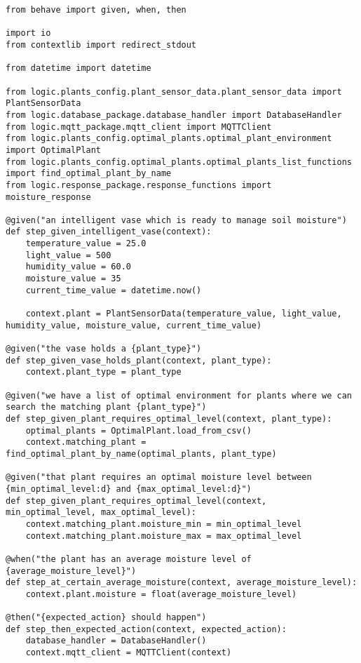\begin{longlisting}
\begin{verbatim}
from behave import given, when, then

import io
from contextlib import redirect_stdout

from datetime import datetime

from logic.plants_config.plant_sensor_data.plant_sensor_data import PlantSensorData
from logic.database_package.database_handler import DatabaseHandler
from logic.mqtt_package.mqtt_client import MQTTClient
from logic.plants_config.optimal_plants.optimal_plant_environment import OptimalPlant
from logic.plants_config.optimal_plants.optimal_plants_list_functions import find_optimal_plant_by_name
from logic.response_package.response_functions import moisture_response

@given("an intelligent vase which is ready to manage soil moisture")
def step_given_intelligent_vase(context):
    temperature_value = 25.0
    light_value = 500
    humidity_value = 60.0
    moisture_value = 35
    current_time_value = datetime.now()

    context.plant = PlantSensorData(temperature_value, light_value, humidity_value, moisture_value, current_time_value)

@given("the vase holds a {plant_type}")
def step_given_vase_holds_plant(context, plant_type):
    context.plant_type = plant_type

@given("we have a list of optimal environment for plants where we can search the matching plant {plant_type}")
def step_given_plant_requires_optimal_level(context, plant_type):
    optimal_plants = OptimalPlant.load_from_csv()
    context.matching_plant = find_optimal_plant_by_name(optimal_plants, plant_type)

@given("that plant requires an optimal moisture level between {min_optimal_level:d} and {max_optimal_level:d}")
def step_given_plant_requires_optimal_level(context, min_optimal_level, max_optimal_level):
    context.matching_plant.moisture_min = min_optimal_level
    context.matching_plant.moisture_max = max_optimal_level

@when("the plant has an average moisture level of {average_moisture_level}")
def step_at_certain_average_moisture(context, average_moisture_level):
    context.plant.moisture = float(average_moisture_level)

@then("{expected_action} should happen")
def step_then_expected_action(context, expected_action):
    database_handler = DatabaseHandler()
    context.mqtt_client = MQTTClient(context)


\end{verbatim}
\end{longlisting}
